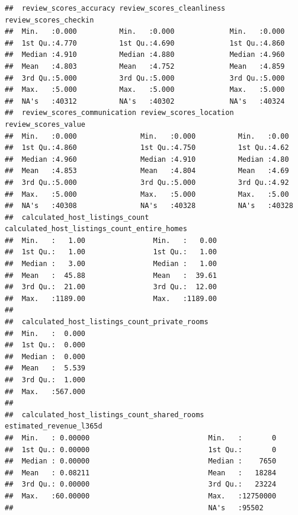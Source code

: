 \documentclass[
]{article}
\begin{document}
\begin{verbatim}
##  review_scores_accuracy review_scores_cleanliness review_scores_checkin
##  Min.   :0.000          Min.   :0.000             Min.   :0.000        
##  1st Qu.:4.770          1st Qu.:4.690             1st Qu.:4.860        
##  Median :4.910          Median :4.880             Median :4.960        
##  Mean   :4.803          Mean   :4.752             Mean   :4.859        
##  3rd Qu.:5.000          3rd Qu.:5.000             3rd Qu.:5.000        
##  Max.   :5.000          Max.   :5.000             Max.   :5.000        
##  NA's   :40312          NA's   :40302             NA's   :40324        
##  review_scores_communication review_scores_location review_scores_value
##  Min.   :0.000               Min.   :0.000          Min.   :0.00       
##  1st Qu.:4.860               1st Qu.:4.750          1st Qu.:4.62       
##  Median :4.960               Median :4.910          Median :4.80       
##  Mean   :4.853               Mean   :4.804          Mean   :4.69       
##  3rd Qu.:5.000               3rd Qu.:5.000          3rd Qu.:4.92       
##  Max.   :5.000               Max.   :5.000          Max.   :5.00       
##  NA's   :40308               NA's   :40328          NA's   :40328      
##  calculated_host_listings_count calculated_host_listings_count_entire_homes
##  Min.   :   1.00                Min.   :   0.00                            
##  1st Qu.:   1.00                1st Qu.:   1.00                            
##  Median :   3.00                Median :   1.00                            
##  Mean   :  45.88                Mean   :  39.61                            
##  3rd Qu.:  21.00                3rd Qu.:  12.00                            
##  Max.   :1189.00                Max.   :1189.00                            
##                                                                            
##  calculated_host_listings_count_private_rooms
##  Min.   :  0.000                             
##  1st Qu.:  0.000                             
##  Median :  0.000                             
##  Mean   :  5.539                             
##  3rd Qu.:  1.000                             
##  Max.   :567.000                             
##                                              
##  calculated_host_listings_count_shared_rooms estimated_revenue_l365d
##  Min.   : 0.00000                            Min.   :       0       
##  1st Qu.: 0.00000                            1st Qu.:       0       
##  Median : 0.00000                            Median :    7650       
##  Mean   : 0.08211                            Mean   :   18284       
##  3rd Qu.: 0.00000                            3rd Qu.:   23224       
##  Max.   :60.00000                            Max.   :12750000       
##                                              NA's   :95502
\end{verbatim}
\end{document}
